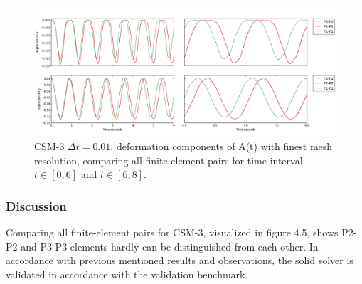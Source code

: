 \begin{figure}[h!]
  \centering
    \includegraphics[scale=0.34]{./Fig/csm3compare.png}
      \caption{CSM-3 $\Delta t = 0.01$, deformation components of A(t) with finest mesh resolution, comparing all finite element pairs for time interval $t \in [0, 6]$  and $t \in [6, 8]$.}
       \label{fig:csm3c}
\end{figure}
\subsubsection*{Discussion}
 
 Comparing all finite-element pairs for CSM-3, visualized in figure 4.5, shows P2-P2 and P3-P3 elements hardly can be distinguished from each other. In accordance with previous mentioned results and observations, the solid solver is validated in accordance with the validation benchmark.
 
